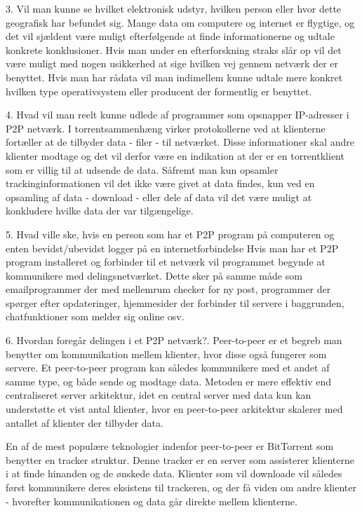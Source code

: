 \documentclass[a4paper,11pt,notitlepage]{report}
\begin{document}
3.  Vil man kunne se hvilket elektronisk udstyr, hvilken person eller hvor dette geografisk har befundet sig.
Mange data om computere og internet er flygtige, og det vil sjældent være muligt efterfølgende at finde informationerne og udtale konkrete konklusioner. Hvis man under en efterforskning straks slår op vil det være muligt med nogen usikkerhed at sige hvilken vej gennem netværk der er benyttet.
Hvis man har rådata vil man indimellem kunne udtale mere konkret hvilken type operativsystem eller producent der formentlig er benyttet.

4.  Hvad vil man reelt kunne udlede af programmer som opsnapper IP-adresser i P2P netværk. I torrentsammenhæng virker protokollerne ved at klienterne fortæller at de tilbyder data - filer - til netværket. Disse informationer skal andre klienter modtage og det vil derfor være en indikation at der er en torrentklient som er villig til at udsende de data.
Såfremt man kun opsamler trackinginformationen vil det ikke være givet at data findes, kun ved en opsamling af data - download - eller dele af data vil det være muligt at konkludere hvilke data der var tilgængelige.


5.  Hvad ville ske, hvis en person som har et P2P program på computeren og enten bevidst/ubevidst logger på en internetforbindelse
Hvis man har et P2P program installeret og forbinder til et netværk vil programmet begynde at kommunikere med delingsnetværket. Dette sker på samme måde som emailprogrammer der med mellemrum checker for ny post, programmer der spørger efter opdateringer, hjemmesider der forbinder til servere i baggrunden, chatfunktioner som melder sig online osv.

6.  Hvordan foregår delingen i et P2P netværk?. Peer-to-peer er et begreb man benytter om kommunikation mellem klienter, hvor disse også fungerer som servere. Et peer-to-peer program kan således kommunikere med et andet af samme type, og både sende og modtage data. Metoden er mere effektiv end centraliseret server arkitektur, idet en central server med data kun kan understøtte et vist antal klienter, hvor en peer-to-peer arkitektur skalerer med antallet af klienter der tilbyder data.

En af de mest populære teknologier indenfor peer-to-peer er BitTorrent som benytter en tracker struktur. Denne tracker er en server som assisterer klienterne i at finde hinanden og de ønskede data. Klienter som vil downloade vil således først kommunikere deres eksistens til trackeren, og der få viden om andre klienter - hvorefter kommunikationen og data går direkte mellem klienterne.
\end{document}
